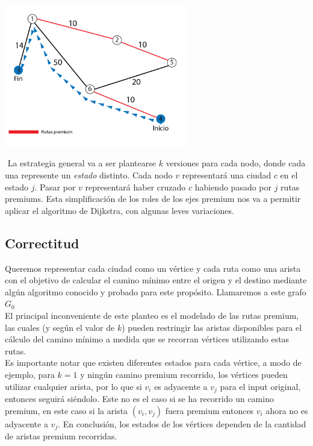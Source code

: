 {\centering
	\includegraphics[width=0.6\textwidth]{imagenes/problema1/problema1-c2-solved.png} \\
}

$ $ \newline
La estrategia general va a ser plantearse $k$ versiones para cada nodo, donde cada una represente un \textit{estado} distinto. Cada nodo $v$ representará una ciudad $c$ en el estado $j$. Pasar por $v$ representará haber cruzado $c$ habiendo pasado por $j$ rutas premiums. Esta simplificación de los roles de los ejes premium nos va a permitir aplicar el algoritmo de Dijkstra, con algunas leves variaciones.

\subsection{Correctitud}
Queremos representar cada ciudad como un vértice y cada ruta como una arista con el objetivo de calcular el camino mínimo entre el origen y el destino mediante algún algoritmo conocido y probado para este propósito. Llamaremos a este grafo $G_0$\\

El principal inconveniente de este planteo es el modelado de las rutas premium, las cuales (y según el valor de $k$) pueden restringir las aristas disponibles para el cálculo del camino mínimo a medida que se recorran vértices utilizando estas rutas.\\

Es importante notar que existen diferentes estados para cada vértice, a modo de ejemplo, para $k=1$ y ningún camino premium recorrido, los vértices pueden utilizar cualquier arista, por lo que si $v_i$ es adyacente a $v_j$ para el input original, entonces seguirá siéndolo. Este no es el caso si se ha recorrido un camino premium, en este caso si la arista $(v_i, v_j)$ fuera premium entonces $v_i$ ahora no es adyacente a $v_j$. En conclusión, los estados de los vértices dependen de la cantidad de aristas premium recorridas.\\

